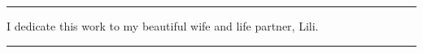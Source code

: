 \null
\vfill


\begin{center}
\noindent\rule[2pt]{0.1\textwidth}{1pt}
I dedicate this work to my beautiful wife and life partner, Lili.
\noindent\rule[2pt]{0.1\textwidth}{1pt}
\end{center}


\vfill

\clearpage
